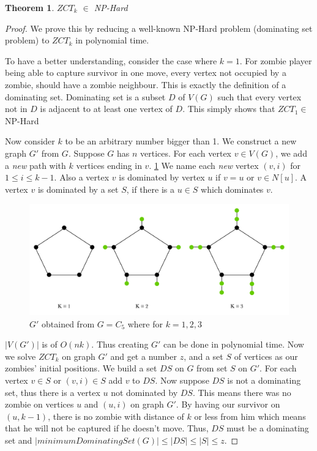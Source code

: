 \documentclass[1p]{elsarticle}
\newtheorem{theorem}{Theorem}
\begin{document}
	\begin{theorem}
		$ZCT_k$ $\in$ NP-Hard
	\end{theorem}
	\begin{proof}
		We prove this by reducing a well-known NP-Hard problem (dominating set problem) to $ZCT_k$ in polynomial time.

		To have a better understanding, consider the case where $k=1$. For zombie player being able to capture survivor in
		one move, every vertex not occupied by a zombie, should have a zombie neighbour. This is exactly the definition
		of a dominating set. Dominating set is a subset $D$ of $V(G)$ such that every vertex not in $D$ is adjacent to
		at least one vertex of $D$. This simply shows that $ZCT_1 \in$ NP-Hard 

		Now consider $k$ to be an arbitrary number bigger than 1. We construct a new graph $G'$ from $G$. Suppose $G$
		has $n$ vertices. For each vertex $v \in V(G)$, we add a {\it new} path with $k$ vertices ending in $v$.
		\ref{fig:p7} We name each {\it new} vertex $(v,i)$ for $1 \leq i \leq k - 1$. Also a vertex $v$ is dominated by
		vertex $u$ if $v = u$ or $v \in N[u]$. A vertex $v$ is dominated by a set $S$, if there is a $u \in S$ which
		dominates $v$.
		
		\begin{figure}[h!]
			\centering
			\includegraphics[width=0.9\linewidth]{fig/ZCT.png}
			\caption{$G'$ obtained from $G = C_5$ where for $k = 1,2,3$}
			\label{fig:p7}
		\end{figure}		


		$|V(G')|$ is of $O(nk)$. Thus creating $G'$ can be done in polynomial time. Now we solve $ZCT_k$ on graph $G'$
		and get a number $z$, and a set $S$ of vertices as our zombies' initial positions. We build a set $DS$ on $G$
		from set $S$ on $G'$. For each vertex $v \in S$ or $(v,i) \in S$ add $v$ to $DS$. Now suppose $DS$ is not a
		dominating set, thus there is a vertex $u$ not dominated by $DS$. This means there was no zombie on vertices $u$
		and $(u,i)$ on graph $G'$. By having our survivor on $(u,k-1)$, there is no zombie with distance of $k$ or less
		from him which means that he will not be captured if he doesn't move. Thus, $DS$ must be a dominating set and $
		|minimumDominatingSet(G)| \leq |DS| \leq |S| \leq z$.


\end{proof}
\end{document}
